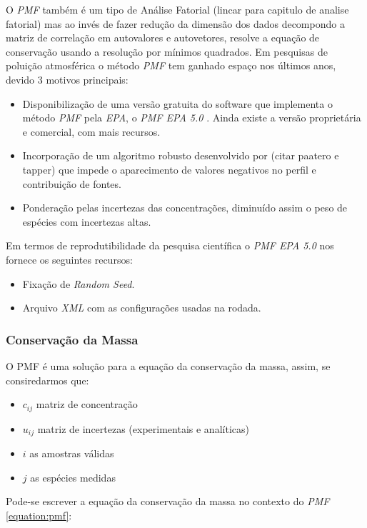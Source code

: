 O \textit{PMF} também é um tipo de Análise Fatorial (lincar para capitulo de analise fatorial)
mas ao invés de fazer redução da dimensão dos dados decompondo a matriz de 
correlação em autovalores e autovetores, resolve a equação de conservação 
usando a resolução por mínimos quadrados. Em pesquisas de poluição atmosférica 
o método \textit{PMF} tem ganhado espaço nos últimos anos, devido 3 motivos 
principais:

\begin{itemize}
  \item Disponibilização de uma versão gratuita do software que implementa 
        o método \textit{PMF} pela \textit{EPA}, o \textit{PMF EPA 5.0} 
        \citep{Norris:2014}. 
        Ainda existe a versão proprietária e comercial, com mais recursos.   
  \item Incorporação de um algoritmo robusto desenvolvido por (citar paatero e tapper) 
        que impede o aparecimento de valores negativos no perfil e 
        contribuição de fontes.
  \item Ponderação pelas incertezas das concentrações, diminuído assim o peso 
        de espécies com incertezas altas.
\end{itemize}  

Em termos de reprodutibilidade da pesquisa científica o \textit{PMF EPA 5.0} 
nos fornece os seguintes recursos:

\begin{itemize}
  \item Fixação de \textit{Random Seed}.
  \item Arquivo \textit{XML} com as configurações usadas na rodada. 
\end{itemize} 

\subsubsection{Conservação da Massa}
O PMF é uma solução para a equação da conservação da massa, assim, se 
consiredarmos que:
\begin{itemize}
  \item $c_{ij}$ matriz de concentração
  \item $u_{ij}$ matriz de incertezas (experimentais e analíticas)
  \item $i$ as amostras válidas
  \item $j$ as espécies medidas
\end{itemize}

Pode-se escrever a equação da conservação da massa no 
contexto do \textit{PMF} \ref{equation:pmf}: 

